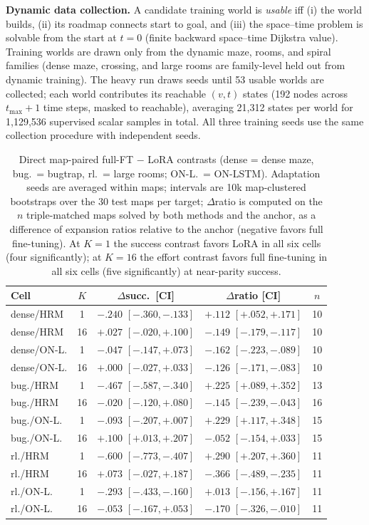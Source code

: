 \documentclass[letterpaper]{article} %
\begin{document}
\textbf{Dynamic data collection.} A candidate training world is \emph{usable} iff (i) the world builds, (ii) its roadmap connects start to goal, and (iii) the space--time problem is solvable from the start at $t{=}0$ (finite backward space--time Dijkstra value). Training worlds are drawn only from the dynamic maze, rooms, and spiral families (dense maze, crossing, and large rooms are family-level held out from dynamic training). The heavy run draws seeds until 53 usable worlds are collected; each world contributes its reachable $(v,t)$ states (192 nodes across $t_{\max}{+}1$ time steps, masked to reachable), averaging 21{,}312 states per world for 1{,}129{,}536 supervised scalar samples in total. All three training seeds use the same collection procedure with independent seeds.

\begin{table}[h]
\centering
\scriptsize
\setlength{\tabcolsep}{2.2pt}
\begin{tabular}{@{}lccc c@{}}
\toprule
Cell & $K$ & $\Delta$succ.\ [CI] & $\Delta$ratio [CI] & $n$ \\
\midrule
dense/HRM & 1 & $-.240$ $[-.360,-.133]$ & $+.112$ $[+.052,+.171]$ & 10 \\
dense/HRM & 16 & $+.027$ $[-.020,+.100]$ & $-.149$ $[-.179,-.117]$ & 10 \\
dense/ON-L. & 1 & $-.047$ $[-.147,+.073]$ & $-.162$ $[-.223,-.089]$ & 10 \\
dense/ON-L. & 16 & $+.000$ $[-.027,+.033]$ & $-.126$ $[-.171,-.083]$ & 10 \\
bug./HRM & 1 & $-.467$ $[-.587,-.340]$ & $+.225$ $[+.089,+.352]$ & 13 \\
bug./HRM & 16 & $-.020$ $[-.120,+.080]$ & $-.145$ $[-.239,-.043]$ & 16 \\
bug./ON-L. & 1 & $-.093$ $[-.207,+.007]$ & $+.229$ $[+.117,+.348]$ & 15 \\
bug./ON-L. & 16 & $+.100$ $[+.013,+.207]$ & $-.052$ $[-.154,+.033]$ & 15 \\
rl./HRM & 1 & $-.600$ $[-.773,-.407]$ & $+.290$ $[+.207,+.360]$ & 11 \\
rl./HRM & 16 & $+.073$ $[-.027,+.187]$ & $-.366$ $[-.489,-.235]$ & 11 \\
rl./ON-L. & 1 & $-.293$ $[-.433,-.160]$ & $+.013$ $[-.156,+.167]$ & 11 \\
rl./ON-L. & 16 & $-.053$ $[-.167,+.053]$ & $-.170$ $[-.326,-.010]$ & 11 \\
\bottomrule
\end{tabular}
\caption{Direct map-paired full-FT $-$ LoRA contrasts (dense = dense maze, bug.\ = bugtrap, rl.\ = large rooms; ON-L.\ = ON-LSTM). Adaptation seeds are averaged within maps; intervals are 10k map-clustered bootstraps over the 30 test maps per target; $\Delta$ratio is computed on the $n$ triple-matched maps solved by both methods and the anchor, as a difference of expansion ratios relative to the anchor (negative favors full fine-tuning). At $K{=}1$ the success contrast favors LoRA in all six cells (four significantly); at $K{=}16$ the effort contrast favors full fine-tuning in all six cells (five significantly) at near-parity success.}
\label{tab:directcontrast}
\end{table}
\end{document}
